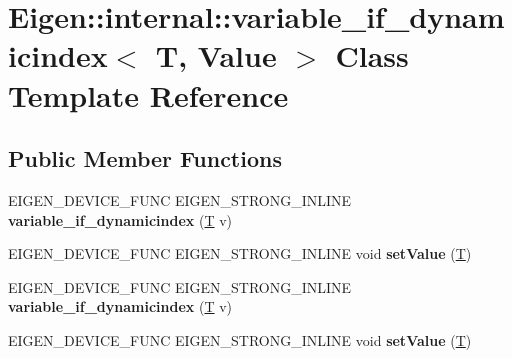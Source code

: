 \hypertarget{class_eigen_1_1internal_1_1variable__if__dynamicindex}{}\section{Eigen\+:\+:internal\+:\+:variable\+\_\+if\+\_\+dynamicindex$<$ T, Value $>$ Class Template Reference}
\label{class_eigen_1_1internal_1_1variable__if__dynamicindex}
\subsection*{Public Member Functions}
\begin{DoxyCompactItemize}
\item 
\mbox{\label{class_eigen_1_1internal_1_1variable__if__dynamicindex_ac645e04882eb7637517b167e6be13685}} 
E\+I\+G\+E\+N\+\_\+\+D\+E\+V\+I\+C\+E\+\_\+\+F\+U\+NC E\+I\+G\+E\+N\+\_\+\+S\+T\+R\+O\+N\+G\+\_\+\+I\+N\+L\+I\+NE {\bfseries variable\+\_\+if\+\_\+dynamicindex} (\hyperlink{group___sparse_core___module}{T} v)
\item 
\mbox{\label{class_eigen_1_1internal_1_1variable__if__dynamicindex_aaab0719fcfb6d88e8b789bb706c2278c}} 
E\+I\+G\+E\+N\+\_\+\+D\+E\+V\+I\+C\+E\+\_\+\+F\+U\+NC E\+I\+G\+E\+N\+\_\+\+S\+T\+R\+O\+N\+G\+\_\+\+I\+N\+L\+I\+NE void {\bfseries set\+Value} (\hyperlink{group___sparse_core___module}{T})
\item 
\mbox{\label{class_eigen_1_1internal_1_1variable__if__dynamicindex_ac645e04882eb7637517b167e6be13685}} 
E\+I\+G\+E\+N\+\_\+\+D\+E\+V\+I\+C\+E\+\_\+\+F\+U\+NC E\+I\+G\+E\+N\+\_\+\+S\+T\+R\+O\+N\+G\+\_\+\+I\+N\+L\+I\+NE {\bfseries variable\+\_\+if\+\_\+dynamicindex} (\hyperlink{group___sparse_core___module}{T} v)
\item 
\mbox{\label{class_eigen_1_1internal_1_1variable__if__dynamicindex_aaab0719fcfb6d88e8b789bb706c2278c}} 
E\+I\+G\+E\+N\+\_\+\+D\+E\+V\+I\+C\+E\+\_\+\+F\+U\+NC E\+I\+G\+E\+N\+\_\+\+S\+T\+R\+O\+N\+G\+\_\+\+I\+N\+L\+I\+NE void {\bfseries set\+Value} (\hyperlink{group___sparse_core___module}{T})
\end{DoxyCompactItemize}
